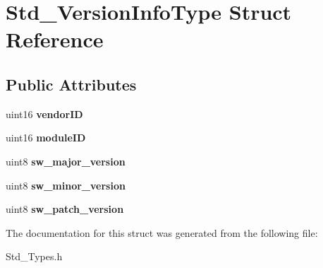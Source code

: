 \hypertarget{structStd__VersionInfoType}{}\section{Std\+\_\+\+Version\+Info\+Type Struct Reference}
\label{structStd__VersionInfoType}
\subsection*{Public Attributes}
\begin{DoxyCompactItemize}
\item 
uint16 {\bfseries vendor\+ID}\hypertarget{structStd__VersionInfoType_a26055f45e3016862f87063d1feccea8d}{}\label{structStd__VersionInfoType_a26055f45e3016862f87063d1feccea8d}

\item 
uint16 {\bfseries module\+ID}\hypertarget{structStd__VersionInfoType_a39e3d6d4bbac41bdba1e51e8876522d2}{}\label{structStd__VersionInfoType_a39e3d6d4bbac41bdba1e51e8876522d2}

\item 
uint8 {\bfseries sw\+\_\+major\+\_\+version}\hypertarget{structStd__VersionInfoType_ad08a3e87fe83d635d0d28fd6e99271af}{}\label{structStd__VersionInfoType_ad08a3e87fe83d635d0d28fd6e99271af}

\item 
uint8 {\bfseries sw\+\_\+minor\+\_\+version}\hypertarget{structStd__VersionInfoType_ab27f4e07c28199c14e79d44a3ea09008}{}\label{structStd__VersionInfoType_ab27f4e07c28199c14e79d44a3ea09008}

\item 
uint8 {\bfseries sw\+\_\+patch\+\_\+version}\hypertarget{structStd__VersionInfoType_af9854c941ce22e88a1718fd2aa183c3c}{}\label{structStd__VersionInfoType_af9854c941ce22e88a1718fd2aa183c3c}

\end{DoxyCompactItemize}


The documentation for this struct was generated from the following file\+:\begin{DoxyCompactItemize}
\item 
Std\+\_\+\+Types.\+h\end{DoxyCompactItemize}
